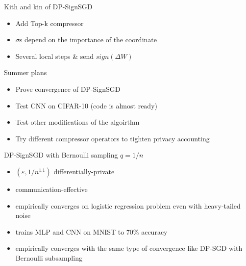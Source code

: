 \documentclass{beamer}
\newcommand{\eps}{\varepsilon}
\begin{document}
\begin{frame}{Kith and kin of DP-SignSGD}
    \begin{itemize}
        \item Add Top-k compressor
        \item $\sigma$s depend on the importance of the coordinate
        \item Several local steps \& send $sign(\Delta W)$
    
    \end{itemize}
\end{frame}
\begin{frame}{Summer plans}
  \begin{itemize}
    \item Prove convergence of DP-SignSGD
    \item Test CNN on CIFAR-10 (code is almost ready)
    \item Test other modifications of the algoirthm
    \item Try different compressor operators to tighten privacy accounting

  \end{itemize}
\end{frame}

\begin{frame}{DP-SignSGD with Bernoulli sampling $q = 1/n$}
    \begin{itemize}
        \item $(\eps, 1/n^{1.1})$ differentially-private
        \item communication-effective
        \item empirically converges on logistic regression problem even with heavy-tailed noise
        \item trains MLP and CNN on MNIST to 70\% accuracy
        \item empirically converges with the same type of convergence like DP-SGD with Bernoulli subsampling
    \end{itemize}
\end{frame}
\end{document}
